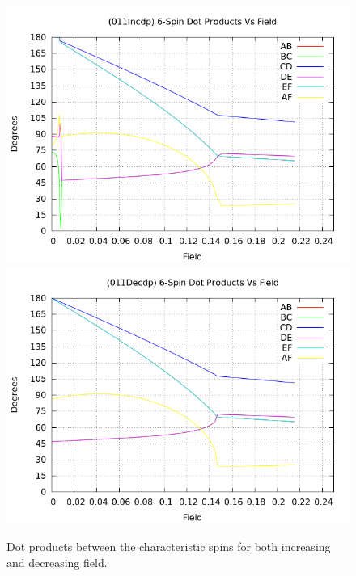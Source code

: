 \documentclass{article}
\begin{document}
\begin{center}
\begin{figure}
\centering
\includegraphics[scale=0.5]{HVariedData/Pictures/011Incdp.png}
\includegraphics[scale=0.5]{HVariedData/Pictures/011Decdp.png}
\caption{Dot products between the characteristic spins for both increasing and decreasing field.}
\end{figure}
\end{center}
\clearpage
\end{document}
